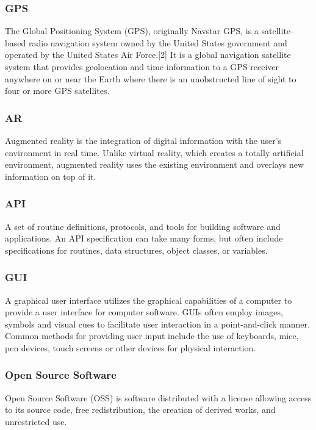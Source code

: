 \subsubsection*{GPS}

The Global Positioning System (GPS), originally Navstar GPS, is a satellite-based radio navigation system owned by the United States government and operated by the United States Air Force.[2] It is a global navigation satellite system that provides geolocation and time information to a GPS receiver anywhere on or near the Earth where there is an unobstructed line of sight to four or more GPS satellites.

\subsubsection*{AR}

Augmented reality is the integration of digital information with the user's environment in real time. Unlike virtual reality, which creates a totally artificial environment, augmented reality uses the existing environment and overlays new information on top of it.

\subsubsection*{API}

A set of routine definitions, protocols, and tools for building software and applications. An API specification can take many forms, but often include specifications for routines, data structures, object classes, or variables.

\subsubsection*{GUI}

A graphical user interface utilizes the graphical capabilities of a computer to provide a
user interface for computer software. GUIs often employ images, symbols and visual cues
to facilitate user interaction in a point-and-click manner. Common methods for providing
user input include the use of keyboards, mice, pen devices, touch screens or other devices
for physical interaction.

\subsubsection*{Open Source Software}

Open Source Software (OSS) is software distributed with a license allowing access to its
source code, free redistribution, the creation of derived works, and unrestricted use.

